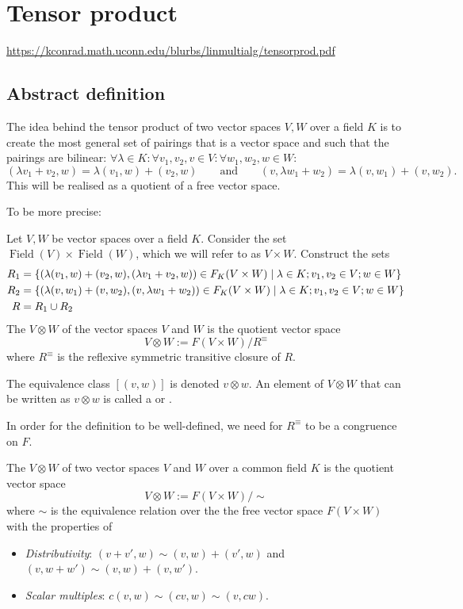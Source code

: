 \section{Tensor product}
\url{https://kconrad.math.uconn.edu/blurbs/linmultialg/tensorprod.pdf}

\subsection{Abstract definition}
The idea behind the tensor product of two vector spaces $V,W$ over a field $K$ is to create the most general set of pairings that is a vector space and such that the pairings are bilinear: $\forall \lambda\in K: \forall v_1,v_2,v\in V:\forall w_1,w_2,w\in W$:
\[ (\lambda v_1+v_2, w) = \lambda (v_1,w)+(v_2,w) \qquad\text{and}\qquad (v,\lambda w_1+w_2) = \lambda (v,w_1) + (v,w_2). \]
This will be realised as a quotient of a free vector space.

To be more precise:
\begin{definition}
Let $V,W$ be vector spaces over a field $K$.
Consider the set $\operatorname{Field}(V)\times \operatorname{Field}(W)$, which we will refer to as $V\times W$. Construct the sets
\begin{align*}
R_1 &= \setbuilder{(\lambda(v_1,w)+(v_2,w),(\lambda v_1+v_2, w))\in F_K(V\times W)}{\lambda\in K; v_1,v_2\in V; w\in W} \\
R_2 &= \setbuilder{(\lambda(v,w_1)+(v,w_2),(v, \lambda w_1 + w_2))\in F_K(V\times W)}{\lambda\in K; v_1,v_2\in V; w\in W} \\
R &= R_1\cup R_2
\end{align*}
The  $V\otimes W$ of the vector spaces $V$ and $W$ is the quotient vector space
\[ V\otimes W := F(V\times W)/R^\equiv \]
where $R^\equiv$ is the reflexive symmetric transitive closure of $R$.

The equivalence class $[(v,w)]$ is denoted $v\otimes w$. An element of $V\otimes W$ that can be written as $v\otimes w$ is called a  or .
\end{definition}
In order for the definition to be well-defined, we need for $R^\equiv$ to be a congruence on $F$.

The  $V\otimes W$ of two vector spaces $V$ and $W$ over a common field $K$ is the quotient vector space
\[ V\otimes W := F(V\times W)/\sim \]
where $\sim$ is the equivalence relation over the the free vector space $F(V\times W)$ with the properties of
\begin{itemize}
\item \textit{Distributivity}: $(v+v', w) \sim (v,w) + (v',w)$ and $(v, w+w') \sim (v,w) + (v,w')$.
\item \textit{Scalar multiples}: $c(v,w) \sim (cv,w) \sim (v,cw)$.
\end{itemize}




